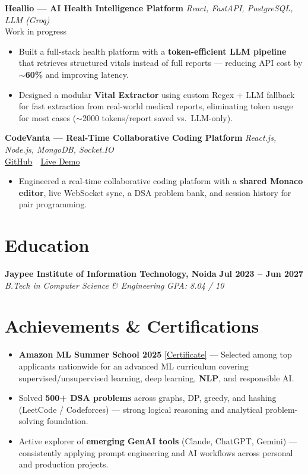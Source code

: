 \documentclass[a4paper,10.5pt]{article}
\newcommand{\resumeSubheading}[4]{%
  \noindent\textbf{\color{accent}#1} \hfill \textbf{\small#2} \\
  \noindent\textit{\small\color{gray}#3} \hfill \textit{\small\color{gray}#4} \vspace{2pt}%
}
\newcommand{\resumeItem}[1]{\item\small #1}
\begin{document}
\vspace{4pt}

\noindent\textbf{\color{accent}Heallio --- AI Health Intelligence Platform}
\hfill \emph{React, FastAPI, PostgreSQL, LLM (Groq)}\\
{\small{Work in progress}}
\begin{itemize}
  \resumeItem{Built a full-stack health platform with a \textbf{token-efficient LLM pipeline} that retrieves structured vitals instead of full reports --- reducing API cost by $\sim$\textbf{60\%} and improving latency.}
  \resumeItem{Designed a modular \textbf{Vital Extractor} using custom Regex + LLM fallback for fast extraction from real-world medical reports, eliminating token usage for most cases ($\sim$2000 tokens/report saved vs.\ LLM-only).}
\end{itemize}

\vspace{4pt}

\noindent\textbf{\color{accent}CodeVanta --- Real-Time Collaborative Coding Platform}
\hfill \emph{React.js, Node.js, MongoDB, Socket.IO}\\
{\small
  \href{https://github.com/Ishita-coder27/Codevanta}{GitHub}
  \,\textbar\,
  \href{https://codevanta-orcin.vercel.app/}{Live Demo}
}
\begin{itemize}
  \resumeItem{Engineered a real-time collaborative coding platform with a \textbf{shared Monaco editor}, live WebSocket sync, a DSA problem bank, and session history for pair programming.}
\end{itemize}

\section*{Education}

\resumeSubheading
{Jaypee Institute of Information Technology, Noida}{Jul 2023 -- Jun 2027}
{B.Tech in Computer Science \& Engineering}{GPA: 8.04 / 10}

\section*{Achievements \& Certifications}

\begin{itemize}
  \resumeItem{\textbf{Amazon ML Summer School 2025} \href{https://drive.google.com/file/d/1T9mSpv0DFmDpvxUingbAiahDqWr-zmf4/view?usp=sharing}{\small[Certificate]} --- Selected among top applicants nationwide for an advanced ML curriculum covering supervised/unsupervised learning, deep learning, \textbf{NLP}, and responsible AI.}
  \resumeItem{Solved \textbf{500+ DSA problems} across graphs, DP, greedy, and hashing (LeetCode / Codeforces) --- strong logical reasoning and analytical problem-solving foundation.}
  \resumeItem{Active explorer of \textbf{emerging GenAI tools} (Claude, ChatGPT, Gemini) --- consistently applying prompt engineering and AI workflows across personal and production projects.}
\end{itemize}
\end{document}
